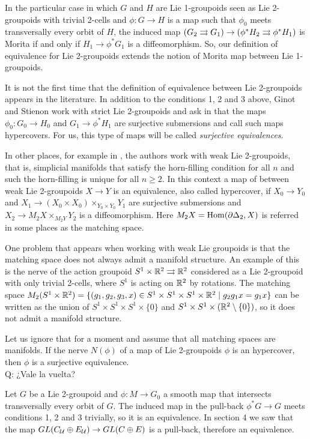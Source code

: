 In the particular case in which $G$ and $H$ are Lie 1-groupoids seen as Lie 2-groupoids with trivial 2-cells and $\phi: G\to H$ is a map such that $\phi_0$ meets transversally every orbit of $H$, the induced map $(G_2\rightrightarrows G_1)\to (\phi^*H_2\rightrightarrows \phi^*H_1)$ is Morita if and only if $H_1\to \phi^*G_1$ is a diffeomorphism.
So, our definition of equivalence for Lie 2-groupoids extends the notion of Morita map between Lie 1-groupoids.

\medskip

It is not the first time that the definition of equivalence between Lie 2-groupoids appears in the literature.
In addition to the conditions 1, 2 and 3 above, Ginot and Stienon work with strict Lie 2-groupoids and ask in \cite{gs} that the maps $\phi_0: G_0\to H_0$ and $G_1 \to \phi^*H_1$ are surjective submersions and call such maps hypercovers.
For us, this type of maps will be called \emph{surjective equivalences}.

In other places, for example in \cite{z}, the authors work with weak Lie 2-groupoids, that is, simplicial manifolds that satisfy the horn-filling condition for all $n$ and such the horn-filling is unique for all $n\geq 2$.
In this context a map of between weak Lie 2-groupoids $X\to Y$ is an equivalence, also called hypercover, if $X_0\to Y_0$ and $X_1\to (X_0\times X_0)\times_{Y_0\times Y_0} Y_1$ are surjective submersions and $X_2\to M_2X\times_{M_2Y} Y_2$ is a diffeomorphism.
Here $M_2X = \operatorname{Hom}(\partial\Delta_2, X)$ is referred in some places as the matching space.

One problem that appears when working with weak Lie groupoids is that the matching space does not always admit a manifold structure.
An example of this is the nerve of the action groupoid $S^1\times\mathbb{R}^2 \rightrightarrows \mathbb{R}^2$ considered as a Lie 2-groupoid with only trivial 2-cells, where $S^1$ is acting on $\mathbb{R}^2$ by rotations.
The matching space
$ M_2(S^1\times\mathbb{R}^2) = \{ (g_1,g_2,g_3,x)\in S^1\times S^1\times S^1\times\mathbb{R}^2 \mid g_2g_1 x = g_1 x \} $
can be written as the union of $S^1\times S^1\times S^1\times \{0\}$ and $S^1\times S^1\times (\mathbb{R}^2\setminus \{0\})$, so it does not admit a manifold structure.

Let us ignore that for a moment and assume that all matching spaces are manifolds.
If the nerve $N(\phi)$ of a map of Lie 2-groupoids $\phi$ is an hypercover, then $\phi$ is a surjective equivalence.\\
Q: ¿Vale la vuelta?

\medskip

Let $G$ be a Lie 2-groupoid and $\phi: M\to G_0$ a smooth map that intersects transversally every orbit of $G$.
The induced map in the pull-back $\phi^*G \to G$ meets conditions 1, 2 and 3 trivially, so it is an equivalence.
In section 4 we saw that the map $GL(C_{\mathcal{U}}\oplus E_{\mathcal{U}}) \to GL(C\oplus E)$ is a pull-back, therefore an equivalence.

